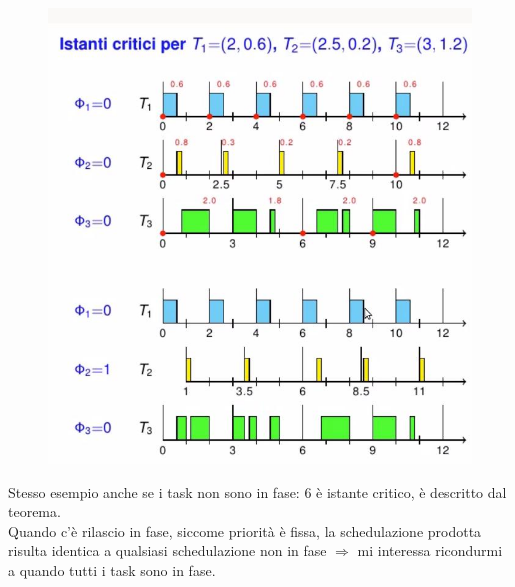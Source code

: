 \documentclass[12pt, oneside]{extbook}
\begin{document}
\begin{figure}[!h]
\centering
\includegraphics[scale=0.4]{immagini/image-001.jpg}
\end{figure}
Stesso esempio anche se i task non sono in fase: 6 è istante critico, è descritto dal teorema.\\ Quando c'è rilascio in fase, siccome priorità è fissa, la schedulazione prodotta risulta identica a qualsiasi schedulazione non in fase $\Rightarrow$ mi interessa ricondurmi a quando tutti i task sono in fase.
\end{document}

